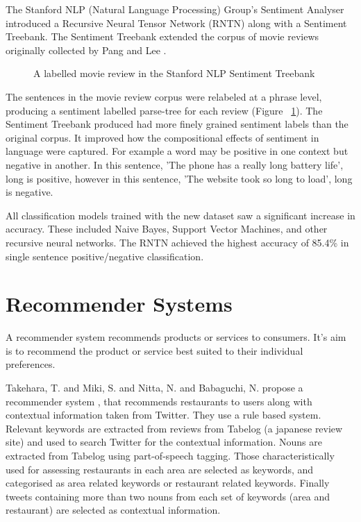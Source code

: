 The Stanford NLP (Natural Language Processing) Group's Sentiment Analyser \cite{stanfordSentiment2013} introduced a Recursive Neural Tensor Network (RNTN) along with a Sentiment Treebank. The Sentiment Treebank extended the corpus of movie reviews originally collected by Pang and Lee \cite{panglee2004}.
\begin{figure}
    \centering
    \setlength{\fboxsep}{0pt}
    \setlength{\fboxrule}{0.01pt}
    \setlength{\belowcaptionskip}{-10pt}
    \caption{A labelled movie review in the Stanford NLP Sentiment Treebank \cite{stanfordSentiment2013}}
    \label{fig:treebank}
\end{figure}
The sentences in the movie review corpus were relabeled at a phrase level, producing a sentiment labelled parse-tree for each review (Figure ~\ref{fig:treebank}). The Sentiment Treebank produced had more finely grained sentiment labels than the original corpus. It improved how the compositional effects of sentiment in language were captured. For example a word may be positive in one context but negative in another. In this sentence, 'The phone has a really long battery life', long is positive, however in this sentence, 'The website took so long to load', long is negative.

All classification models trained with the new dataset saw a significant increase in accuracy. These included Naive Bayes, Support Vector Machines, and other recursive neural networks. The RNTN achieved the highest accuracy of 85.4\% in single sentence positive/negative classification.

\section{Recommender Systems}

A recommender system recommends products or services to consumers. It's aim is to recommend the product or service best suited to their individual preferences.

Takehara, T. and Miki, S. and Nitta, N. and Babaguchi, N. propose a recommender system \cite{takeharaContext2012}, that recommends restaurants to users along with contextual information taken from Twitter. They use a rule based system. Relevant keywords are extracted from reviews from Tabelog (a japanese review site) and used to search Twitter for the contextual information. Nouns are extracted from Tabelog using part-of-speech tagging. Those characteristically used for assessing restaurants in each area are selected as keywords, and categorised as area related keywords or restaurant related keywords. Finally tweets containing more than two nouns from each set of keywords (area and restaurant) are selected as contextual information.


